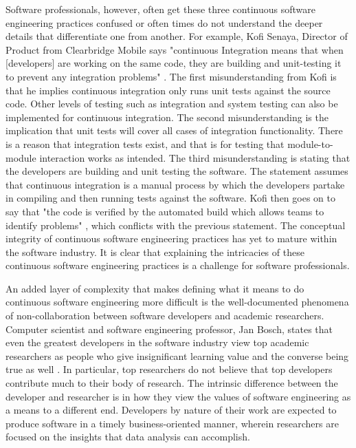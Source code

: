 \documentclass[12pt,a4paper]{article}
\begin{document}
Software professionals, however, often get these three continuous software engineering practices confused or often times do not understand the deeper details that differentiate one from another. For example, Kofi Senaya, Director of Product from Clearbridge Mobile says "continuous Integration means that when [developers] are working on the same code, they are building and unit-testing it to prevent any integration problems" \cite{stackify_2018}. The first misunderstanding from Kofi is that he implies continuous integration only runs unit tests against the source code. Other levels of testing such as integration and system testing can also be implemented for continuous integration. The second misunderstanding is the implication that unit tests will cover all cases of integration functionality. There is a reason that integration tests exist, and that is for testing that module-to-module interaction works as intended. The third misunderstanding is stating that the developers are building and unit testing the software. The statement assumes that continuous integration is a manual process by which the developers partake in compiling and then running tests against the software. Kofi then goes on to say that "the code is verified by the automated build which allows teams to identify problems" \cite{stackify_2018}, which conflicts with the previous statement. The conceptual integrity of continuous software engineering practices has yet to mature within the software industry. It is clear that explaining the intricacies of these continuous software engineering practices is a challenge for software professionals.

An added layer of complexity that makes defining what it means to do continuous software engineering more difficult is the well-documented phenomena of non-collaboration between software developers and academic researchers. Computer scientist and software engineering professor, Jan Bosch, states that even the greatest developers in the software industry view top academic researchers as people who give insignificant learning value and the converse being true as well \cite[p. ~29]{bosch_2014}. In particular, top researchers do not believe that top developers contribute much to their body of research. The intrinsic difference between the developer and researcher is in how they view the values of software engineering as a means to a different end. Developers by nature of their work are expected to produce software in a timely business-oriented manner, wherein researchers are focused on the insights that data analysis can accomplish.
\end{document}
